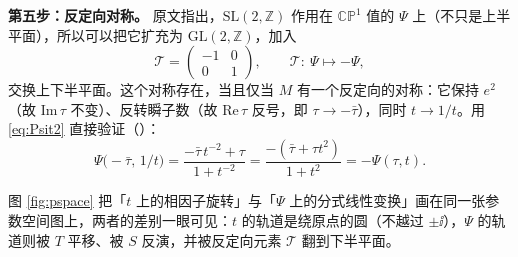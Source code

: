 \textbf{第五步：反定向对称。} 原文指出，$\mathrm{SL}(2,\mathbb Z)$ 作用在 $\mathbb{CP}^1$ 值的 $\Psi$ 上（不只是上半平面），所以可以把它扩充为 $\mathrm{GL}(2,\mathbb Z)$，加入\pA{}
\begin{equation}
\mathcal T=\begin{pmatrix}-1&0\\0&1\end{pmatrix},
\qquad
\mathcal T:\ \Psi\longmapsto-\Psi,
\label{eq:Trev}
\end{equation}
交换上下半平面。这个对称存在，当且仅当 $M$ 有一个反定向的对称：它保持 $e^2$（故 $\mathrm{Im}\,\tau$ 不变）、反转瞬子数（故 $\mathrm{Re}\,\tau$ 反号，即 $\tau\to-\bar\tau$），同时 $t\to1/t$\pA{}。用 \eqref{eq:Psit2} 直接验证（\pB）：
\begin{equation}
\Psi\bigl(-\bar\tau,\,1/t\bigr)
=\frac{-\bar\tau\,t^{-2}+\tau}{1+t^{-2}}
=\frac{-(\bar\tau+\tau t^2)}{1+t^2}=-\Psi(\tau,t).
\label{eq:Psiminus}
\end{equation}

图 \ref{fig:pspace} 把「$t$ 上的相因子旋转」与「$\Psi$ 上的分式线性变换」画在同一张参数空间图上，两者的差别一眼可见：$t$ 的轨道是绕原点的圆（不越过 $\pm\ii$），$\Psi$ 的轨道则被 $T$ 平移、被 $S$ 反演，并被反定向元素 $\mathcal T$ 翻到下半平面。

